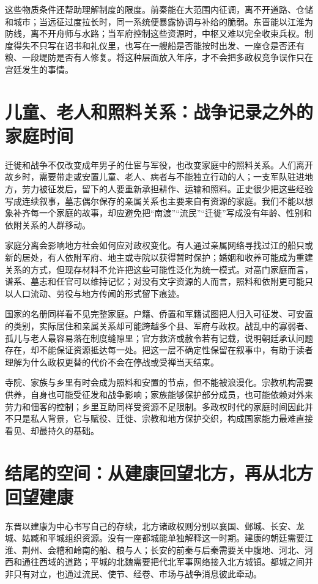 这些物质条件还帮助理解制度的限度。前秦能在大范围内征调，离不开道路、仓储和城市；当远征过度拉长时，同一系统便暴露协调与补给的脆弱。东晋能以江淮为防线，离不开舟师与水路；当军府控制这些资源时，中枢又难以完全收束兵权。制度得失不只写在诏书和礼仪里，也写在一艘船是否能按时出发、一座仓是否还有粮、一段堤防是否有人修复。将这种层面放入年序，才不会把多政权竞争误作只在宫廷发生的事情。

\section{儿童、老人和照料关系：战争记录之外的家庭时间}
\label{sec:eastern-jin-depth-care}

迁徙和战争不仅改变成年男子的仕宦与军役，也改变家庭中的照料关系。人们离开故乡时，需要带走或安置儿童、老人、病者与不能独立行动的人；一支军队驻进地方，劳力被征发后，留下的人要重新承担耕作、运输和照料。正史很少把这些经验写成连续叙事，墓志偶尔保存的亲属关系也主要来自有资源的家庭。我们不能以想象补齐每一个家庭的故事，却应避免把“南渡”“流民”“迁徙”写成没有年龄、性别和依附关系的人群移动。

家庭分离会影响地方社会如何应对政权变化。有人通过亲属网络寻找过江的船只或新的居处，有人依附军府、地主或寺院以获得暂时保护；婚姻和收养可能成为重建关系的方式，但现存材料不允许把这些可能性泛化为统一模式。对高门家庭而言，谱系、墓志和任官可以维持记忆；对没有文字资源的人而言，照料和依附更可能只以人口流动、劳役与地方传闻的形式留下痕迹。

国家的名册同样看不见完整家庭。户籍、侨置和军籍试图把人归入可征发、可安置的类别，实际居住和亲属关系却可能跨越多个县、军府与政权。战乱中的寡弱者、孤儿与老人最容易落在制度缝隙里；官方救济或赦令若有记载，说明朝廷承认问题存在，却不能保证资源抵达每一处。把这一层不确定性保留在叙事中，有助于读者理解为什么政权更替的代价不会在停战或受禅当天结束。

寺院、家族与乡里有时会成为照料和安置的节点，但不能被浪漫化。宗教机构需要供养，自身也可能受征发和战争影响；家族能够保护部分成员，也可能依赖对外来劳力和佃客的控制；乡里互助同样受资源不足限制。多政权时代的家庭时间因此并不只是私人背景，它与赋役、迁徙、宗教和地方保护交织，构成国家能力最难直接看见、却最持久的基础。

\section{结尾的空间：从建康回望北方，再从北方回望建康}
\label{sec:eastern-jin-depth-spatial-return}

东晋以建康为中心书写自己的存续，北方诸政权则分别以襄国、邺城、长安、龙城、姑臧和平城组织资源。没有一座都城能单独解释这一时期。建康的朝廷需要江淮、荆州、会稽和岭南的船、粮与人；长安的前秦与后秦需要关中腹地、河北、河西和通往西域的道路；平城的北魏需要把代北军事网络接入北方城镇。都城之间并非只有对立，也通过流民、使节、经卷、市场与战争消息彼此牵动。

